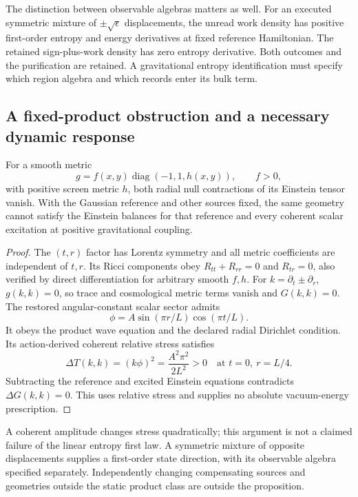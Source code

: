 The distinction between observable algebras matters as well. For an
executed symmetric mixture of \(\pm\sqrt\epsilon\) displacements, the
unread work density has positive first-order entropy and energy derivatives
at fixed reference Hamiltonian. The retained sign-plus-work density has
zero entropy derivative. Both outcomes and the purification are retained.
A gravitational entropy identification must specify which region algebra
and which records enter its bulk term.

\subsection{A fixed-product obstruction and a necessary dynamic response}

\begin{proposition}
\label{prop:static-product}
For a smooth metric
\[
 g=f(x,y)\operatorname{diag}(-1,1,h(x,y)),\qquad f>0,
\]
with positive screen metric \(h\), both radial null contractions of its
Einstein tensor vanish. With the Gaussian reference and other sources fixed,
the same geometry cannot satisfy the Einstein balances for that reference
and every coherent scalar excitation at positive gravitational coupling.
\end{proposition}

\begin{proof}
The \((t,r)\) factor has Lorentz symmetry and all metric coefficients are
independent of \(t,r\). Its Ricci components obey
\(R_{tt}+R_{rr}=0\) and \(R_{tr}=0\), also verified by direct differentiation
for arbitrary smooth \(f,h\). For \(k=\partial_t\pm\partial_r\),
\(g(k,k)=0\), so trace and cosmological metric terms vanish and
\(G(k,k)=0\). The restored angular-constant scalar sector admits
\[
 \phi=A\sin(\pi r/L)\cos(\pi t/L).
\]
It obeys the product wave equation and the declared radial Dirichlet
condition. Its action-derived coherent relative stress satisfies
\[
 \Delta T(k,k)=(k\phi)^2
   =\frac{A^2\pi^2}{2L^2}>0
 \quad\text{at }t=0,\ r=L/4.
\]
Subtracting the reference and excited Einstein equations contradicts
\(\Delta G(k,k)=0\). This uses relative stress and supplies no absolute
vacuum-energy prescription.
\end{proof}

A coherent amplitude changes stress quadratically; this argument is not
a claimed failure of the linear entropy first law. A symmetric mixture of
opposite displacements supplies a first-order state direction, with its
observable algebra specified separately. Independently changing compensating
sources and geometries outside the static product class are outside the
proposition.

